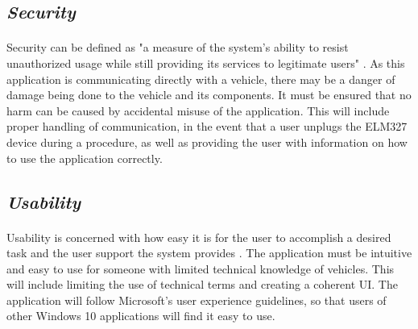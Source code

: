 	\subsection*{\textit{Security}}
		\paragraph{}{
		Security can be defined as "a measure of the system's ability to resist unauthorized usage while still providing its services to legitimate users" \cite{SAinP}. As this application is communicating directly with a vehicle, there may be a danger of damage being done to the vehicle and its components. It must be ensured that no harm can be caused by accidental misuse of the application. This will include proper handling of communication, in the event that a user unplugs the ELM327 device during a procedure, as well as providing the user with information on how to use the application correctly.
		}		
	\subsection*{\textit{Usability}}
		\paragraph{}{
		Usability is concerned with how easy it is for the user to accomplish a desired task and the user support the system provides \cite{SAinP}. The application must be intuitive and easy to use for someone with limited technical knowledge of vehicles. This will include limiting the use of technical terms and creating a coherent UI. The application will follow Microsoft's user experience guidelines, so that users of other Windows 10 applications will find it easy to use.
		}
